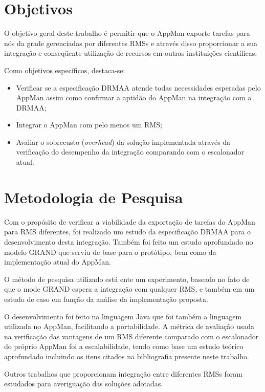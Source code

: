 \section{Objetivos}

O objetivo geral deste trabalho é permitir que o AppMan exporte tarefas para nós da grade gerenciadas por diferentes RMSs e através disso proporcionar a sua integração e conseqüente utilização de recursos em outras instituições científicas.

Como objetivos específicos, destaca-se:
    \begin{itemize}
        \item Verificar se a especificação DRMAA atende todas necessidades esperadas pelo AppMan assim como confirmar a aptidão do AppMan na integração com a DRMAA;
        \item Integrar o AppMan com pelo menos um RMS;
        \item Avaliar o sobrecusto (\emph{overhead}) da solução implementada através da verificação do desempenho da integração comparando com o escalonador atual.
    \end{itemize}
    
\section{Metodologia de Pesquisa}    
Com o propósito de verificar a viabilidade da exportação de tarefas do AppMan para RMS diferentes, foi realizado um estudo da especificação DRMAA para o desenvolvimento desta integração. Também foi feito um estudo aprofundado no modelo GRAND que serviu de base para o protótipo, bem como da implementação atual do AppMan.

O método de pesquisa utilizado está ente um experimento, baseado no fato de que o mode GRAND espera a integração com qualquer RMS, e também em um estudo de caso em função da análise da implementação proposta. 

O desenvolvimento foi feito na linguagem Java que foi também a linguagem utilizada no AppMan, facilitando a portabilidade. A métrica de avaliação usada na verificação das vantagens de um RMS diferente comparado com o escalonador do próprio AppMan foi a escalabilidade,  tendo como base um estudo teórico aprofundado incluindo os itens citados na bibliografia presente neste trabalho.

Outros trabalhos que proporcionam integração entre diferentes RMSs foram estudados para averiguação das soluções adotadas. 

